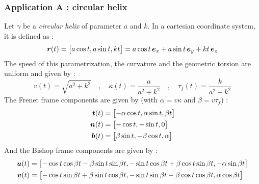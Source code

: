 \subsubsection{Application A : circular helix}
Let $\gamma$ be a \emph{circular helix} of parameter $a$ and $k$. In a cartesian coordinate system, it is defined as :
\begin{equation}
	\boldsymbol{r}(t) 
	=
	\begin{bmatrix}
		a \cos t, a \sin t, k t
	\end{bmatrix}
	= a \cos t \, \boldsymbol{e}_x + a \sin t \, \boldsymbol{e}_y + k t \, \boldsymbol{e}_z
\end{equation}
The speed of this parametrization, the curvature and the geometric torsion are uniform and given by :
\begin{equation}
	v(t) = \sqrt{a^2+k^2}
	\quad,\quad
	\kappa(t) = \frac{a}{a^2 + k^2}
	\quad,\quad
	\tau_f(t) = \frac{k}{a^2 + k^2}
\end{equation}
The Frenet frame components are given by (with $\alpha = v \kappa$ and $\beta = v \tau_f$) :
\begin{equation}
	\begin{aligned}
	\boldsymbol{t}(t) &=
		\begin{bmatrix} 
			- \alpha \cos t, \alpha \sin t, \beta t 
		\end{bmatrix}
	\\
	\boldsymbol{n}(t) &= 
		\begin{bmatrix} 
			-\cos t, -\sin t, 0 
		\end{bmatrix}
	\\
	\boldsymbol{b}(t) &=
		\begin{bmatrix} 
			\beta \sin t, - \beta \cos t, \alpha
	\end{bmatrix} 	
	\end{aligned}
\end{equation}
And the Bishop frame components are given by :
\begin{equation}
	\begin{aligned}
		\boldsymbol{u}(t) &= 
		\begin{bmatrix} 	
			-\cos t \cos \beta t - \beta  \sin t \sin \beta t, -\sin t \cos \beta t + \beta  \cos t \sin \beta t, - \alpha \sin \beta t
		\end{bmatrix}
		\\
		\boldsymbol{v}(t) &= 
		\begin{bmatrix} 
			-\cos t \sin \beta t + \beta  \sin t \cos \beta t, -\sin t \sin \beta t - \beta  \cos t \cos \beta t, \alpha \cos \beta t
		\end{bmatrix}
	\end{aligned}
\end{equation}


